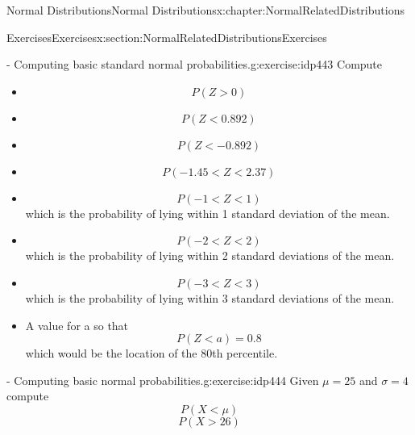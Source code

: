 \documentclass[oneside,10pt,]{book}
\numberwithin{equation}{section}
\newcommand{\lt}{<}
\newcommand{\gt}{>}
\begin{document}
\begin{chapterptx}{Normal Distributions}{}{Normal Distributions}{}{}{x:chapter:NormalRelatedDistributions}
%
\begin{sectionptx}{Exercises}{}{Exercises}{}{}{x:section:NormalRelatedDistributionsExercises}
\begin{inlineexercise}{- Computing basic standard normal probabilities.}{g:exercise:idp443}%
Compute%
\begin{itemize}[label=\textbullet]
\item{}%
\begin{equation*}
P( Z \gt 0)
\end{equation*}
%
\item{}%
\begin{equation*}
P( Z \lt 0.892)
\end{equation*}
%
\item{}%
\begin{equation*}
P( Z \lt -0.892)
\end{equation*}
%
\item{}%
\begin{equation*}
P( -1.45 \lt Z \lt 2.37)
\end{equation*}
%
\item{}%
\begin{equation*}
P( -1 \lt Z \lt 1)
\end{equation*}
which is the probability of lying within 1 standard deviation of the mean.%
\item{}%
\begin{equation*}
P( -2 \lt Z \lt 2)
\end{equation*}
which is the probability of lying within 2 standard deviations of the mean.%
\item{}%
\begin{equation*}
P( -3 \lt Z \lt 3)
\end{equation*}
which is the probability of lying within 3 standard deviations of the mean.%
\item{}A value for a so that%
\begin{equation*}
P( Z \lt a) = 0.8
\end{equation*}
which would be the location of the 80th percentile.%
\end{itemize}
%
\end{inlineexercise}%
\begin{inlineexercise}{- Computing basic normal probabilities.}{g:exercise:idp444}%
Given \(\mu = 25\) and \(\sigma = 4\) compute%
\begin{equation*}
P(X \lt \mu)
\end{equation*}
%
\begin{equation*}
P( X \gt 26)

\end{equation*}
\end{inlineexercise}
\end{sectionptx}
\end{chapterptx}
\end{document}
